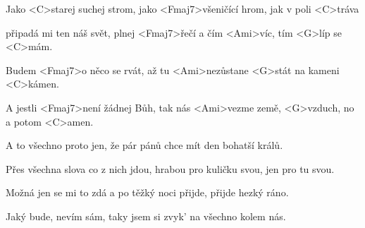 

\zs
Jako <C>starej suchej strom, jako <Fmaj7>všeničící hrom,
jak v poli <C>tráva

připadá mi ten náš svět, plnej <Fmaj7>řečí a čím <Ami>víc, tím 
<G>líp se <C>mám.
\ks

\zr
Budem <Fmaj7>o něco se rvát, až tu <Ami>nezůstane <G>stát na 
kameni <C>kámen.

A jestli <Fmaj7>není žádnej Bůh, tak nás <Ami>vezme země, 
<G>vzduch, no a potom <C>amen.
\kr


\zs
A to všechno proto jen, že pár pánů chce mít den bohatší králů.

Přes všechna slova co z nich jdou, hrabou pro kuličku svou, jen pro tu svou.
\ks


\zs
Možná jen se mi to zdá a po těžký noci přijde, přijde hezký ráno.

Jaký bude, nevím sám, taky jsem si zvyk' na všechno kolem nás.
\ks

\kp
